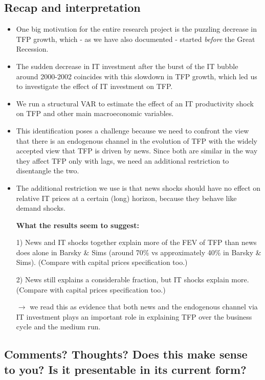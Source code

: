 \documentclass{article}
\begin{document}
\newpage
\subsection*{Recap and interpretation}

\begin{itemize}
\item One big motivation for the entire research project is the puzzling decrease in TFP growth, which - as we have also documented - started \emph{before} the Great Recession.
\item The sudden decrease in IT investment after the burst of the IT bubble around 2000-2002 coincides with this slowdown in TFP growth, which led us to investigate the effect of IT investment on TFP. 
\item We run a structural VAR to estimate the effect of an IT productivity shock on TFP and other main macroeconomic variables.
\item This identification poses a challenge because we need to confront the view that there is an endogenous channel in the evolution of TFP with the widely accepted view that TFP is driven by news. Since both are similar in the way they affect TFP only with lags, we need an additional restriction to disentangle the two.
\item The additional restriction we use is that news shocks should have no effect on relative IT prices at a certain (long) horizon, because they behave like demand shocks.
\item [] \textbf{What the results seem to suggest:}
\item [1)] News and IT shocks together explain more of the FEV of TFP than news does alone in Barsky \& Sims (around 70\% vs approximately 40\% in Barsky \& Sims). (Compare with capital prices specification too.)
\item [2)] News still explains a considerable fraction, but IT shocks explain more. (Compare with capital prices specification too.)
\item [] $\rightarrow$ we read this as evidence that both news and the endogenous channel via IT investment plays an important role in explaining TFP  over the business cycle and the medium run. 
\end{itemize}

\subsection*{Comments? Thoughts? Does this make sense to you? Is it presentable in its current form?}
\end{document}
